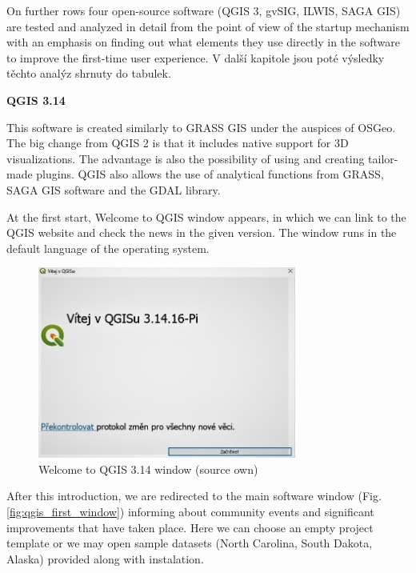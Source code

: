 \documentclass[a4paper,10pt,twoside]{article}
\begin{document}
\noindent On further rows four open-source software (QGIS 3, gvSIG, ILWIS, SAGA GIS) are tested and analyzed in detail from the point of view of the startup mechanism with an emphasis on finding out what elements they use directly in the software to improve the first-time user experience. V další kapitole jsou poté výsledky těchto analýz shrnuty do tabulek. 

\bigskip

\noindent \textbf {QGIS 3.14}

\noindent This software is created similarly to GRASS GIS under the auspices of OSGeo. The big change from QGIS 2 is that it includes native support for 3D visualizations. The advantage is also the possibility of using and creating tailor-made plugins. QGIS also allows the use of analytical functions from GRASS, SAGA GIS software and the GDAL library. 

At the first start, Welcome to QGIS window appears, in which we can link to the QGIS website and check the news in the given version. The window runs in the default language of the operating system.

\vspace{0.3cm}
\begin{figure}[hbt!] 
\begin{center}
\includegraphics[width=8.5cm]{../pictures/qgis_startup_window.JPG} 
\caption[Welcome to QGIS 3.14 window (source own)]{Welcome to QGIS 3.14 window (source own)}
\label{fig:qgis_startup_window}
\end{center}
\end{figure}

\noindent After this introduction, we are redirected to the main software window (Fig. \ref{fig:qgis_first_window})  informing about community events and significant improvements that have taken place. Here we can choose an empty project template or we may open sample datasets (North Carolina, South Dakota, Alaska) provided along with instalation.
\end{document}
